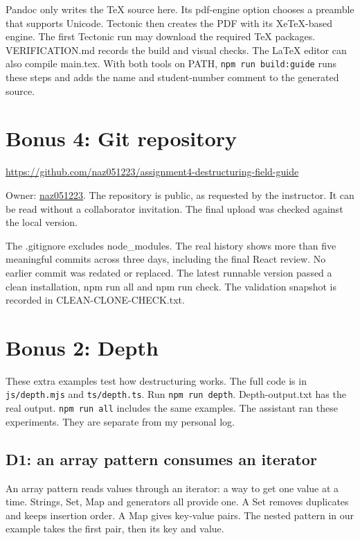 \documentclass[
  10pt,
  a4paper,
]{article}
\begin{document}
Pandoc only writes the TeX source here. Its pdf-engine option chooses a
preamble that supports Unicode. Tectonic then creates the PDF with its
XeTeX-based engine. The first Tectonic run may download the required TeX
packages. VERIFICATION.md records the build and visual checks. The LaTeX
editor can also compile main.tex. With both tools on PATH,
\texttt{npm run build:\allowbreak{}guide} runs these steps and adds the
name and student-number comment to the generated source.

\section{Bonus 4: Git repository}\label{bonus-4-git-repository}

\url{https://github.com/naz051223/assignment4-destructuring-field-guide}

Owner: \href{https://github.com/naz051223}{naz051223}. The repository is
public, as requested by the instructor. It can be read without a
collaborator invitation. The final upload was checked against the local
version.

The .gitignore excludes node\_modules. The real history shows more than
five meaningful commits across three days, including the final React
review. No earlier commit was redated or replaced. The latest runnable
version passed a clean installation, npm run all and npm run check. The
validation snapshot is recorded in CLEAN-CLONE-CHECK.txt.

\section{Bonus 2: Depth}\label{bonus-2-depth}

These extra examples test how destructuring works. The full code is in
\texttt{js/\allowbreak{}depth.\allowbreak{}mjs} and
\texttt{ts/\allowbreak{}depth.\allowbreak{}ts}. Run
\texttt{npm run depth}. Depth-output.txt has the real output.
\texttt{npm run all} includes the same examples. The assistant ran these
experiments. They are separate from my personal log.

\subsection{D1: an array pattern consumes an
iterator}\label{d1-an-array-pattern-consumes-an-iterator}

An array pattern reads values through an iterator: a way to get one
value at a time. Strings, Set, Map and generators all provide one. A Set
removes duplicates and keeps insertion order. A Map gives key-value
pairs. The nested pattern in our example takes the first pair, then its
key and value.
\end{document}
